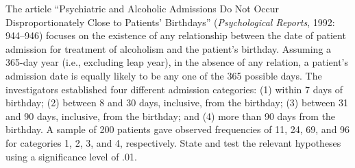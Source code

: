 \documentclass[11pt,letterpaper,boxed]{hmcpset}
\begin{document}
    \begin{solution}
        \vfill
    \end{solution}
    \newpage


    \begin{problem}[14.1.8]
        The article ``Psychiatric and Alcoholic Admissions Do Not Occur Disproportionately Close to Patients’ Birthdays'' (\textit{Psychological Reports}, 1992: 944--946) focuses on the existence of any relationship between the date of patient admission for treatment of alcoholism and the patient's birthday. Assuming a 365-day year (i.e., excluding leap year), in the absence of any relation, a patient's admission date is equally likely to be any one of the 365 possible days. The investigators established four different admission categories: (1) within 7 days of birthday; (2) between 8 and 30 days, inclusive, from the birthday; (3) between 31 and 90 days, inclusive, from the birthday; and (4) more than 90 days from the birthday. A sample of 200 patients gave observed frequencies of 11, 24, 69, and 96 for categories 1, 2, 3, and 4, respectively. State and test the relevant hypotheses using a significance level of .01.
    \end{problem}

    \begin{solution}
        \vfill
    \end{solution}
\end{document}
